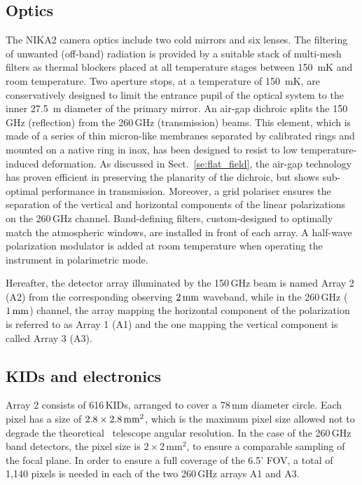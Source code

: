 \subsection{Optics}
\label{se:instru_optics}
The NIKA2 camera optics include two cold mirrors and six lenses. The
filtering of unwanted (off-band) radiation is provided by a suitable stack of
multi-mesh filters {\lp as thermal blockers} placed at all temperature
stages between 150~mK and room temperature. {\lp Two aperture stops,
at a temperature of 150~mK, are conservatively designed to limit the
entrance pupil of the optical system to the inner 27.5~m diameter of
the primary mirror. }
An air-gap dichroic splits the 150\,GHz (reflection)
from the 260\,GHz (transmission) beams. {\lp This element, which is
made of a series of thin micron-like membranes separated by calibrated
rings and mounted on a native ring in inox, has been designed to
resist to low temperature-induced deformation.}
As discussed in Sect.~\ref{se:flat_field}, the air-gap technology has proven efficient
in preserving the planarity of the dichroic, but shows sub-optimal
performance in transmission. Moreover, a grid polariser ensures the
separation of the vertical and horizontal components of the linear
polarizations on the 260\,GHz channel. Band-defining filters, custom-designed to
optimally match the atmospheric windows, are installed in
front of each array. A half-wave polarization modulator is added at room
temperature when operating the instrument in polarimetric mode.

Hereafter, the detector array illuminated by the 150\,GHz beam is named Array
2 (A2) from the corresponding observing $2\, \rm{mm}$ waveband,
while in the 260\,GHz ($1\, \rm{mm}$) channel, the array mapping the
horizontal component of the polarization is referred to as Array 1 (A1)
and the one mapping the vertical component is called Array 3 (A3). 

\subsection{KIDs and electronics}
\label{se:array}

Array 2 consists of 616\,KIDs, arranged to cover a 78\,mm diameter
circle. Each pixel has a size of $2.8\times2.8\textrm{\,mm}^2$, which
is the maximum pixel size allowed not to degrade the theoretical
\trentemetre\ telescope angular resolution. In the
case of the 260\,GHz band detectors, the pixel size is $2\times
2\mathrm{\,mm}^2$, to ensure a comparable sampling of the focal
plane. In order to ensure a full coverage of the 6.5' FOV, a total of
1,140 pixels is needed in each of the two 260\,GHz arrays A1 and A3. 

